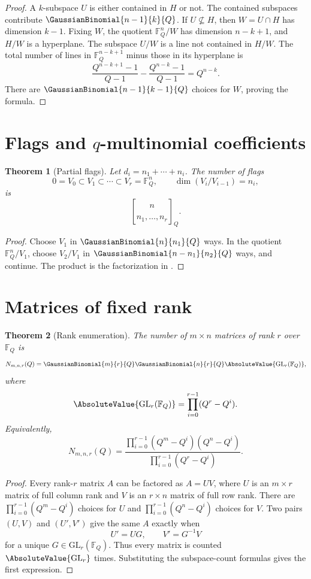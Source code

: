 \documentclass[11pt,a4paper,oneside,openany]{book}
\newtheorem{theorem}{Theorem}[chapter]
\theoremstyle{definition}
\theoremstyle{remark}
\newcommand{\F}{\mathbb F}
\begin{document}
\begin{proof}
A $k$-subspace $U$ is either contained in $H$ or not.  The contained subspaces contribute $\GaussianBinomial{n-1}{k}{Q}$.  If $U\not\subseteq H$, then $W=U\cap H$ has dimension $k-1$.  Fixing $W$, the quotient $\F_Q^n/W$ has dimension $n-k+1$, and $H/W$ is a hyperplane.  The subspace $U/W$ is a line not contained in $H/W$.  The total number of lines in $\F_Q^{n-k+1}$ minus those in its hyperplane is
\[
 \frac{Q^{n-k+1}-1}{Q-1}-\frac{Q^{n-k}-1}{Q-1}=Q^{n-k}.
\]
There are $\GaussianBinomial{n-1}{k-1}{Q}$ choices for $W$, proving the formula.
\end{proof}

\section{Flags and \texorpdfstring{$q$}{q}-multinomial coefficients}

\begin{theorem}[Partial flags]\label{thm:flag-count}
Let $d_i=n_1+\cdots+n_i$.  The number of flags
\[
 0=V_0\subset V_1\subset\cdots\subset V_r=\F_Q^n,
 \qquad \dim(V_i/V_{i-1})=n_i,
\]
is
\[
 \genfrac{[}{]}{0pt}{}{n}{n_1,\dots,n_r}_{Q}.
\]
\end{theorem}

\begin{proof}
Choose $V_1$ in $\GaussianBinomial{n}{n_1}{Q}$ ways.  In the quotient $\F_Q^n/V_1$, choose $V_2/V_1$ in $\GaussianBinomial{n-n_1}{n_2}{Q}$ ways, and continue.  The product is the factorization in .
\end{proof}

\section{Matrices of fixed rank}

\begin{theorem}[Rank enumeration]\label{thm:rank-matrices}
The number of $m\times n$ matrices of rank $r$ over $\F_Q$ is
\[
 N_{m,n,r}(Q)
 =\GaussianBinomial{m}{r}{Q}\GaussianBinomial{n}{r}{Q}\AbsoluteValue{\mathrm{GL}_r(\F_Q)},
\]
where
\[
 \AbsoluteValue{\mathrm{GL}_r(\F_Q)}=\prod_{i=0}^{r-1}(Q^r-Q^i).
\]
Equivalently,
\[
 N_{m,n,r}(Q)
 =\frac{\prod_{i=0}^{r-1}(Q^m-Q^i)(Q^n-Q^i)}
 {\prod_{i=0}^{r-1}(Q^r-Q^i)}.
\]
\end{theorem}

\begin{proof}
Every rank-$r$ matrix $A$ can be factored as $A=UV$, where $U$ is an $m\times r$ matrix of full column rank and $V$ is an $r\times n$ matrix of full row rank.  There are
\(
 \prod_{i=0}^{r-1}(Q^m-Q^i)
\)
choices for $U$ and
\(
 \prod_{i=0}^{r-1}(Q^n-Q^i)
\)
choices for $V$.  Two pairs $(U,V)$ and $(U',V')$ give the same $A$ exactly when
\[
 U'=UG,\qquad V'=G^{-1}V
\]
for a unique $G\in\mathrm{GL}_r(\F_Q)$.  Thus every matrix is counted $\AbsoluteValue{\mathrm{GL}_r}$ times.  Substituting the subspace-count formulas gives the first expression.
\end{proof}
\end{document}
